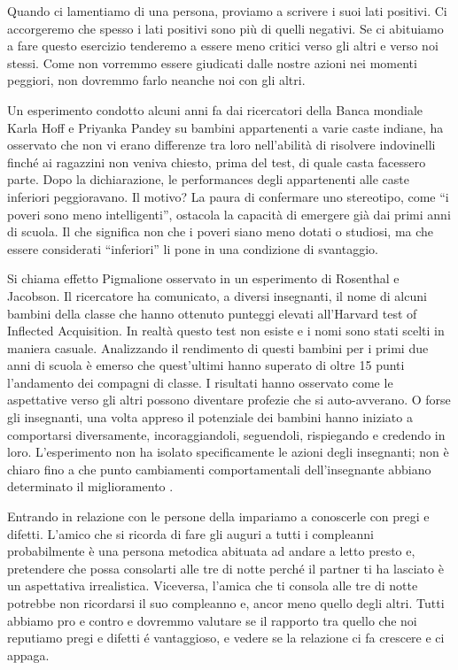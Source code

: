 \documentclass[12pt]{book} %
\begin{document}
Quando ci lamentiamo di una persona, proviamo a scrivere i suoi lati positivi. Ci accorgeremo che spesso i lati positivi
sono più di quelli negativi. Se ci abituiamo a fare questo esercizio tenderemo a essere meno critici verso gli altri e verso
noi stessi. Come non vorremmo essere giudicati dalle nostre azioni nei momenti peggiori, non dovremmo farlo neanche noi
con gli altri.

Un esperimento condotto alcuni anni fa dai ricercatori della Banca mondiale Karla Hoff e Priyanka Pandey su bambini
appartenenti a varie caste indiane, ha osservato che non vi erano differenze tra loro nell'abilità di risolvere
indovinelli finché ai ragazzini non veniva chiesto, prima del test, di quale casta facessero parte. Dopo la
dichiarazione, le performances degli appartenenti alle caste inferiori peggioravano. Il motivo? La paura di confermare
uno stereotipo, come “i poveri sono meno intelligenti”, ostacola la capacità di emergere già dai primi anni di scuola.
Il che significa non che i poveri siano meno dotati o studiosi, ma che essere considerati “inferiori” li pone in una
condizione di svantaggio. 

Si chiama effetto Pigmalione osservato in un esperimento di Rosenthal e Jacobson. Il ricercatore ha comunicato, a
diversi insegnanti, il nome di alcuni bambini della classe che hanno ottenuto punteggi elevati
all'Harvard test of Inflected Acquisition. In realtà questo test non esiste e i nomi sono stati
scelti in maniera casuale. Analizzando il rendimento di questi bambini per i primi due anni di scuola è emerso che
quest'ultimi hanno superato di oltre 15 punti l'andamento dei compagni di
classe. I risultati hanno osservato come le aspettative verso gli altri possono diventare profezie che si auto-avverano. O
forse gli insegnanti, una volta appreso il potenziale dei bambini hanno iniziato a comportarsi diversamente,
incoraggiandoli, seguendoli, rispiegando e credendo in loro. L'esperimento non ha isolato specificamente le azioni degli insegnanti; non è chiaro fino a che punto cambiamenti comportamentali dell’insegnante abbiano determinato il miglioramento
.

Entrando in relazione con le persone della impariamo a conoscerle con pregi e difetti.
L'amico che si ricorda di fare gli auguri a tutti i compleanni probabilmente è una persona
metodica abituata ad andare a letto presto e, pretendere che possa consolarti alle tre di notte perché il partner ti ha
lasciato è un aspettativa irrealistica. Viceversa, l'amica che ti consola alle tre di notte
potrebbe non ricordarsi il suo compleanno e, ancor meno quello degli altri. Tutti abbiamo pro e contro e dovremmo
valutare se il rapporto tra quello che noi reputiamo pregi e difetti é vantaggioso, e vedere se la relazione ci fa crescere e ci appaga.
\end{document}
